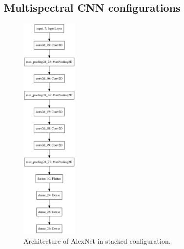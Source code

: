 \documentclass{l4proj}
\begin{document}
%
% 

\begin{appendices}


\chapter{Multispectral CNN configurations}
\label{appendix_arch}

\begin{figure}[ht]
  \centering
  \includegraphics[width=0.25\textwidth]{images/models/keras/stacked.png}
  \caption{Architecture of AlexNet in stacked configuration.}
\end{figure}


\end{appendices}
\end{document}
